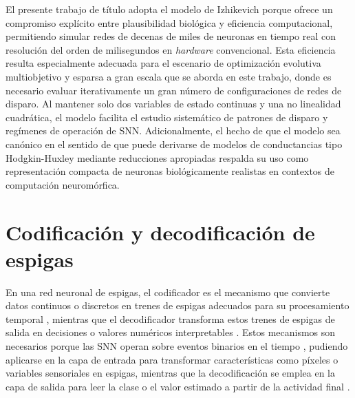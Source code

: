 El presente trabajo de título adopta el modelo de Izhikevich porque ofrece un compromiso explícito entre plausibilidad biológica y eficiencia computacional, permitiendo simular redes de decenas de miles de neuronas en tiempo real con resolución del orden de milisegundos en \textit{hardware} convencional. Esta eficiencia resulta especialmente adecuada para el escenario de optimización evolutiva multiobjetivo y esparsa a gran escala que se aborda en este trabajo, donde es necesario evaluar iterativamente un gran número de configuraciones de redes de disparo. Al mantener solo dos variables de estado continuas y una no linealidad cuadrática, el modelo facilita el estudio sistemático de patrones de disparo y regímenes de operación de SNN. Adicionalmente, el hecho de que el modelo sea canónico en el sentido de que puede derivarse de modelos de conductancias tipo Hodgkin-Huxley mediante reducciones apropiadas respalda su uso como representación compacta de neuronas biológicamente realistas en contextos de computación neuromórfica.


\section{Codificación y decodificación de espigas}\label{sec:codificacion-y-deco}

En una red neuronal de espigas, el codificador es el mecanismo que convierte datos continuos o discretos en trenes de espigas adecuados para su procesamiento temporal \cite{Wang2019spiketrainkernels, MAASS19971659ssnthirdgeneration}, mientras que el decodificador transforma estos trenes de espigas de salida en decisiones o valores numéricos interpretables \cite{Tavanaei2019dlinsnn, Schuman2022Opportunities}. Estos mecanismos son necesarios porque las SNN operan sobre eventos binarios en el tiempo \cite{Schuman2022Opportunities}, pudiendo aplicarse en la capa de entrada para transformar características como píxeles o variables sensoriales en espigas, mientras que la decodificación se emplea en la capa de salida para leer la clase o el valor estimado a partir de la actividad final \cite{Wang2019spiketrainkernels}.

